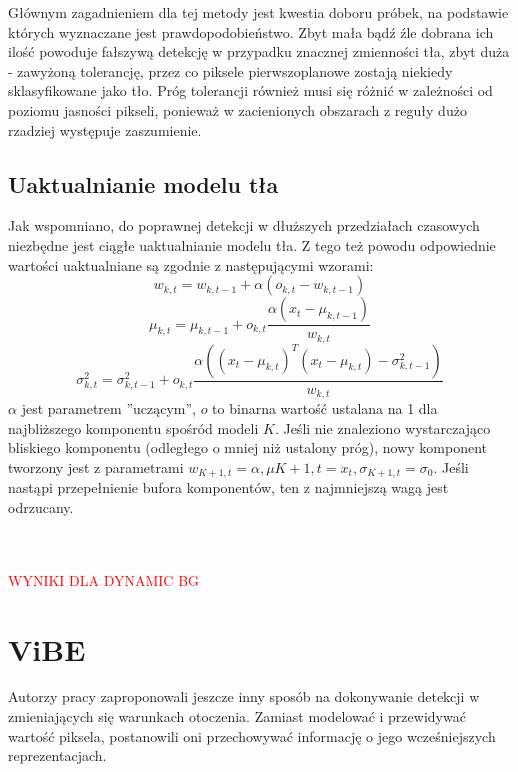 Głównym zagadnieniem dla tej metody jest kwestia doboru próbek, na podstawie których wyznaczane jest prawdopodobieństwo. Zbyt mała bądź źle dobrana ich ilość powoduje fałszywą detekcję w przypadku znacznej zmienności tła, zbyt duża - zawyżoną tolerancję, przez co piksele pierwszoplanowe zostają niekiedy sklasyfikowane jako tło. Próg tolerancji również musi się różnić w zależności od poziomu jasności pikseli, ponieważ w zacienionych obszarach z reguły dużo rzadziej występuje zaszumienie.
\subsection{Uaktualnianie modelu tła}
Jak wspomniano, do poprawnej detekcji w dłuższych przedziałach czasowych niezbędne jest ciągłe uaktualnianie modelu tła. Z tego też powodu odpowiednie wartości uaktualniane są zgodnie z następującymi wzorami:
\begin{equation}
w_{k,t} = w_{k,t-1}+\alpha(o_{k,t}-w_{k,t-1})
\end{equation}
\begin{equation}
\mu_{k,t} = \mu_{k,t-1}+o_{k,t}\frac{\alpha (x_{t}-\mu_{k,t-1})}{w_{k,t}}
\end{equation}
\begin{equation}
\sigma^2_{k,t} = \sigma^2_{k,t-1}+o_{k,t}\frac{\alpha ((x_{t}-\mu_{k,t})^{T}(x_{t}-\mu_{k,t})-\sigma^2_{k,t-1})}{w_{k,t}}
\end{equation}
$\alpha$ jest parametrem ''uczącym'', $o$ to binarna wartość ustalana na 1 dla najbliższego komponentu spośród modeli $K$. Jeśli nie znaleziono wystarczająco bliskiego komponentu (odległego o mniej niż ustalony próg), nowy komponent tworzony jest z parametrami $w_{K+1,t} = \alpha, \mu{K+1,t}= x_{t}, \sigma_{K+1,t}=\sigma_{0}$. Jeśli nastąpi przepełnienie bufora komponentów, ten z najmniejszą wagą jest odrzucany. \\ \\ \\
\begin{LARGE}
\textcolor{red}{WYNIKI DLA DYNAMIC BG}
\end{LARGE}
\section{ViBE}
Autorzy pracy \cite{barnich2011vibe} zaproponowali jeszcze inny sposób na dokonywanie detekcji w zmieniających się warunkach otoczenia. Zamiast modelować i przewidywać wartość piksela, postanowili oni przechowywać informację o jego wcześniejszych reprezentacjach.
